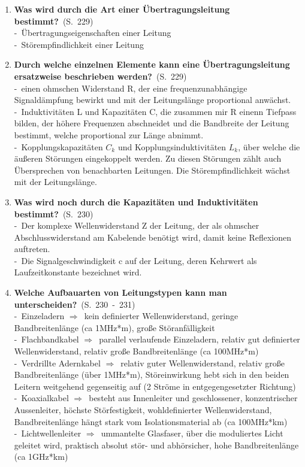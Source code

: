 \documentclass[a4paper,12pt]{article}
\newcommand{\question}[3]{\pagebreak[3]\item {\textbf{#1?}}\ (S.\ #2)#3}
\newcommand{\catchword}[1]{\\-\ #1}
\newcommand{\resultol}[1]{$\Rightarrow$\ #1}
\newcommand{\page}[1]{#1}
\newcommand{\pages}[2]{#1\ -\ #2}
\begin{document}
\begin{enumerate}
  \question{Was wird durch die Art einer Übertragungsleitung bestimmt}{\page{229}}
  {
    \catchword{Übertragungseigenschaften einer Leitung}
    \catchword{Störempfindlichkeit einer Leitung}
  }

  \question{Durch welche einzelnen Elemente kann eine Übertragungsleitung ersatzweise
            beschrieben werden}{\page{229}}
  {
    \catchword{einen ohmschen Widerstand R, der eine frequenzunabhängige Signaldämpfung bewirkt und
               mit der Leitungslänge proportional anwächst.}
    \catchword{Induktivitäten L und Kapazitäten C, die zusammen mir R einenn Tiefpass bilden, der höhere
               Frequenzen abschneidet und die Bandbreite der Leitung bestimmt, welche proportional
               zur Länge abnimmt.}
    \catchword{Kopplungskapazitäten $C_k$ und Kopplungsinduktivitäten $L_k$, über welche die äußeren
               Störungen eingekoppelt werden. Zu diesen Störungen zählt auch Übersprechen von benachbarten
               Leitungen. Die Störempfindlichkeit wächst mit der Leitungslänge.}
  }

  \question{Was wird noch durch die Kapazitäten und Induktivitäten bestimmt}{\page{230}}
  {
    \catchword{Der komplexe Wellenwiderstand Z der Leitung, der als ohmscher Abschlusswiderstand
               am Kabelende benötigt wird, damit keine Reflexionen auftreten.}
    \catchword{Die Signalgeschwindigkeit c auf der Leitung, deren Kehrwert als Laufzeitkonstante
               bezeichnet wird.}
  }

  \question{Welche Aufbauarten von Leitungstypen kann man unterscheiden}{\pages{230}{231}}
  {
    \catchword{Einzeladern \resultol{kein definierter Wellenwiderstand, geringe Bandbreitenlänge
               (ca 1MHz*m), große Störanfälligkeit}}
    \catchword{Flachbandkabel \resultol{parallel verlaufende Einzeladern, relativ gut definierter
               Wellenwiderstand, relativ große Bandbreitenlänge (ca 100MHz*m)}}
    \catchword{Verdrillte Adernkabel \resultol{relativ guter Wellenwiderstand, relativ große 
               Bandbreitenlänge (über 1MHz*m), Störeinwirkung hebt sich in den beiden Leitern weitgehend
               gegenseitig auf (2 Ströme in entgegengesetzter Richtung)}}
    \catchword{Koaxialkabel \resultol{besteht aus Innenleiter und geschlossener, konzentrischer
               Aussenleiter, höchste Störfestigkeit, wohldefinierter Wellenwiderstand, Bandbreitenlänge
               hängt stark vom Isolationsmaterial ab (ca 100MHz*km)}}
    \catchword{Lichtwellenleiter \resultol{ummantelte Glasfaser, über die moduliertes Licht geleitet
               wird, praktisch absolut stör- und abhörsicher, hohe Bandbreitenlänge (ca 1GHz*km)}}
  }


\end{enumerate}
\end{document}
